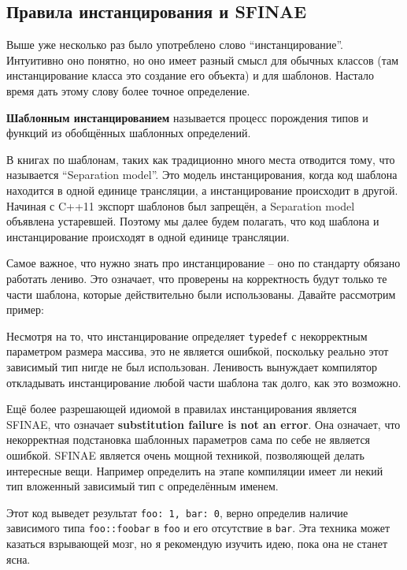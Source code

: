 \documentclass[a4paper,12pt,oneside]{article}
\begin{document}
\subsection{Правила инстанцирования и SFINAE}

Выше уже несколько раз было употреблено слово ``инстанцирование''. Интуитивно оно понятно, но оно имеет разный смысл для обычных классов (там инстанцирование класса это создание его объекта) и для шаблонов. Настало время дать этому слову более точное определение.

\textbf{Шаблонным инстанцированием} называется процесс порождения типов и функций из обобщённых шаблонных определений.

В книгах по шаблонам, таких как \cite{vandervoord} традиционно много места отводится тому, что называется ``Separation model''. Это модель инстанцирования, когда код шаблона находится в одной единице трансляции, а инстанцирование происходит в другой. Начиная с C++11 \cite{stdcpp11} экспорт шаблонов был запрещён, а Separation model объявлена устаревшей. Поэтому мы далее будем полагать, что код шаблона и инстанцирование происходят в одной единице трансляции.

Самое важное, что нужно знать про инстанцирование -- оно по стандарту обязано работать лениво. Это означает, что проверены на корректность будут только те части шаблона, которые действительно были использованы. Давайте рассмотрим пример:



Несмотря на то, что инстанцирование определяет \lstinline!typedef! с некорректным параметром размера массива, это не является ошибкой, поскольку реально этот зависимый тип нигде не был использован. Ленивость вынуждает компилятор откладывать инстанцирование любой части шаблона так долго, как это возможно.

Ещё более разрешающей идиомой в правилах инстанцирования является SFINAE, что означает \textbf{substitution failure is not an error}. Она означает, что некорректная подстановка шаблонных параметров сама по себе не является ошибкой. SFINAE является очень мощной техникой, позволяющей делать интересные вещи. Например определить на этапе компиляции имеет ли некий тип вложенный зависимый тип с определённым именем.



Этот код выведет результат \lstinline!foo: 1, bar: 0!, верно определив наличие зависимого типа \lstinline!foo::foobar! в \lstinline!foo! и его отсутствие в \lstinline!bar!. Эта техника может казаться взрывающей мозг, но я рекомендую изучить идею, пока она не станет ясна.
\end{document}
